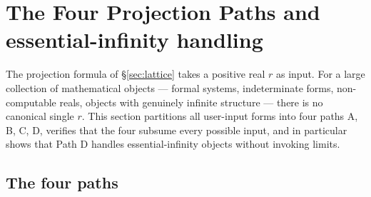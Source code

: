 \documentclass[11pt,a4paper]{article}
\theoremstyle{definition}
\theoremstyle{remark}
\begin{document}
\section{The Four Projection Paths and essential-infinity handling}\label{sec:paths}

The projection formula of \S\ref{sec:lattice} takes a positive real $r$ as input. For a large collection of mathematical objects --- formal systems, indeterminate forms, non-computable reals, objects with genuinely infinite structure --- there is no canonical single $r$. This section partitions all user-input forms into four paths A, B, C, D, verifies that the four subsume every possible input, and in particular shows that Path D handles essential-infinity objects without invoking limits.

\subsection{The four paths}
\end{document}
